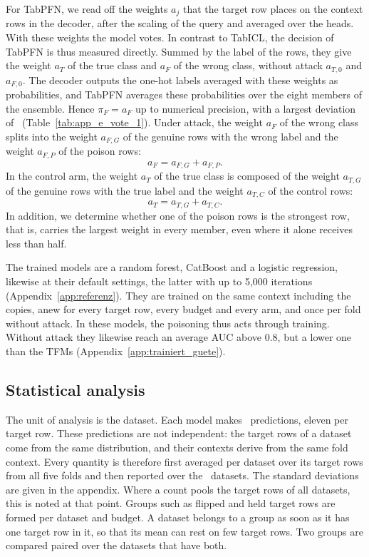 \documentclass[pdflatex,sn-mathphys-num]{sn-jnl}
\newcommand{\pf}{\pi_F}
\begin{document}
For TabPFN, we read off the weights $a_j$ that the target row places on
the context rows in the decoder, after the scaling of the query
\citep{grinsztajn2026, jaeger2026} and averaged over the heads. With
these weights the model votes. In contrast to TabICL, the decision of
TabPFN is thus measured directly. Summed by the label of the rows, they
give the weight $a_T$ of the true class and $a_F$ of the wrong class,
without attack $a_{T,0}$ and $a_{F,0}$. The decoder outputs the one-hot
labels averaged with these weights as probabilities, and TabPFN averages
these probabilities over the eight members of the ensemble. Hence
$\pf = a_F$ up to numerical precision, with a largest deviation of
\zPFNidentMax\ (Table~\ref{tab:app_e_vote_1}). Under attack, the weight
$a_F$ of the wrong class splits into the weight $a_{F,G}$ of the genuine
rows with the wrong label and the weight $a_{F,P}$ of the poison rows:
\[
  a_F = a_{F,G} + a_{F,P}.
\]
In the control arm, the weight $a_T$ of the true class is composed of the
weight $a_{T,G}$ of the genuine rows with the true label and the weight
$a_{T,C}$ of the control rows:
\[
  a_T = a_{T,G} + a_{T,C}.
\]
In addition, we determine whether one of the poison rows is the strongest
row, that is, carries the largest weight in every member, even where it
alone receives less than half.

The trained models are a random forest, CatBoost
\citep{prokhorenkova2018} and a logistic regression, likewise at their
default settings, the latter with up to 5,000 iterations
(Appendix~\ref{app:referenz}). They are trained on the same context
including the copies, anew for every target row, every budget and every
arm, and once per fold without attack. In these models, the poisoning thus acts
through training. Without attack they
likewise reach an average AUC above 0.8, but a lower one than the TFMs
(Appendix~\ref{app:trainiert_guete}).

\subsection{Statistical analysis}
\label{sec:statistik}

The unit of analysis is the dataset. Each model makes \zVorhersagen\
predictions, eleven per target row. These predictions are not
independent: the target rows of a dataset come from the same
distribution, and their contexts derive from the same fold context. Every quantity
is therefore first averaged per dataset over its target rows from all
five folds and then reported over the \zDS\ datasets. The standard
deviations are given in the appendix. Where a count pools the target
rows of all datasets, this is noted at that point. Groups such as
flipped and held target rows are formed per dataset and budget. A
dataset belongs to a group as soon as it has one target row in it, so
that its mean can rest on few target rows. Two groups are compared
paired over the datasets that have both.
\end{document}
